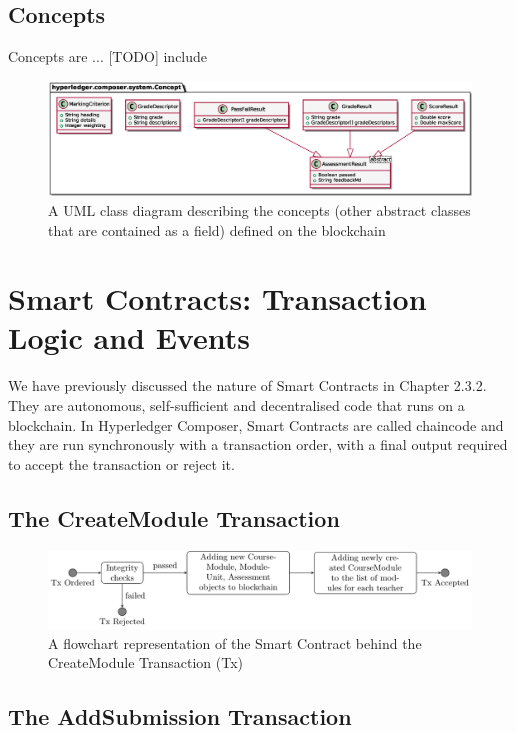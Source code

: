 \subsection{Concepts}

Concepts are ... [TODO] include 

\begin{figure}[!ht] 
    \centering    
    \includegraphics[width=1.0\textwidth]{concepts}
    \caption[Concepts Class Diagram]
        {A UML class diagram describing the concepts (other abstract classes that are contained as a field) defined on the blockchain} 
    \label{fig:concepts}
\end{figure}

\section{Smart Contracts: Transaction Logic and Events}

We have previously discussed the nature of Smart Contracts in Chapter 2.3.2. They are autonomous, self-sufficient and 
decentralised code that runs on a blockchain. In Hyperledger Composer, Smart Contracts are called chaincode and 
they are run synchronously with a transaction order, with a final output required to accept the transaction or reject it.

\subsection{The CreateModule Transaction}
\begin{figure}[!ht]
    \centering
    \includegraphics[width=1.0\textwidth]{cmtx}
    \caption{A flowchart representation of the Smart Contract behind the CreateModule Transaction (Tx)} \label{fig:cmtx}
\end{figure}

\subsection{The AddSubmission Transaction}

